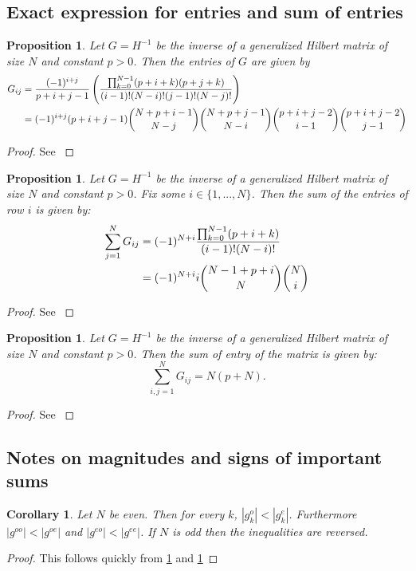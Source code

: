 \documentclass{article}
\newtheorem{cor}[thm]{Corollary}
\newtheorem{prop}[thm]{Proposition}
\theoremstyle{definition}
\theoremstyle{remark}
\numberwithin{equation}{section}
\begin{document}
\subsection{Exact expression for entries and sum of entries}
\begin{prop}\label{inverse-hilbert-matrix-entry}
Let $G=H^{-1}$ be the inverse of a generalized Hilbert matrix of size $N$ and constant $p>0$. Then the entries of $G$ are given by 
\begin{align}\label{entries}
 G_{ij} &= \frac{(-1)^{i+j}}{p+i+j-1} \left( \frac{\prod_{k=0}^{N-1} (p+i+k)(p+j+k)}{(i-1)! (N-i)! (j-1)! (N-j)!}\right) \\
 &= \label{entries-combinatorial-form} (-1)^{i+j} (p+i+j-1) \dbinom{N+p+i-1}{N-j} \dbinom{N+p+j-1}{N-i} \dbinom{p+i+j-2}{i-1} \dbinom{p+i+j-2}{j-1}
\end{align}
\end{prop}
\begin{proof} See \cite{collar1940reciprocation}
\end{proof}

\begin{prop}\label{inverse-hilbert-matrix-row}
Let $G=H^{-1}$ be the inverse of a generalized Hilbert matrix of size $N$ and constant $p>0$. Fix some $i \in \{1,...,N\}$. Then the sum of the entries of row $i$ is given by: 
\begin{align}\label{sum-of-row}
\sum_{j=1}^N G_{ij} &= (-1)^{N+i} \frac{\prod_{k=0}^{N-1} (p+i+k)}{(i-1)! (N-i)!} \\
&= (-1)^{N+i} i \dbinom{N-1+p+i}{N} \dbinom{N}{i} \label{sum-of-row-combinatorial-form}
\end{align}
\end{prop}
\begin{proof} See \cite{smith1959inversion}
\end{proof}

\begin{prop}\label{inverse-hilbert-matrix-total} 
Let $G=H^{-1}$ be the inverse of a generalized Hilbert matrix of size $N$ and constant $p>0$. Then the sum of entry of the matrix is given by:
\begin{equation}\label{total-sum}
\sum_{i,j=1}^N G_{ij} = N(p+N).
\end{equation}
\end{prop} 
\begin{proof} See \cite{smith1959inversion}
\end{proof}

\subsection{Notes on magnitudes and signs of important sums}
\begin{cor}
Let $N$ be even. Then for every $k$,  $|g_k^o| < |g_k^e|$. Furthermore $|g^{oo}| < |g^{oe}|$ and $|g^{eo}| < |g^{ee}|$.  If $N$ is odd then the inequalities are reversed. 
\end{cor}
\begin{proof}
This follows quickly from \ref{inverse-hilbert-matrix-row} and \ref{inverse-hilbert-matrix-entry}
\end{proof}
\end{document}
